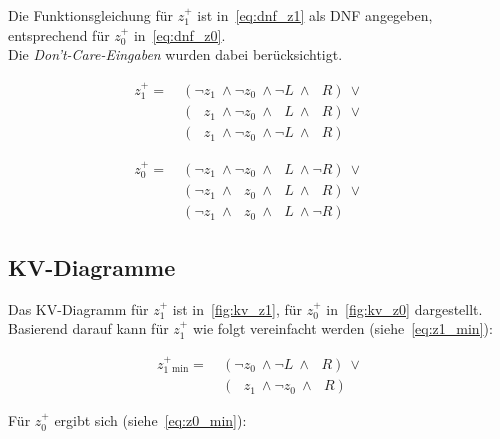 Die Funktionsgleichung für $z_1^+$ ist in~\ref{eq:dnf_z1} als DNF angegeben, entsprechend für $z_0^+$ in~\ref{eq:dnf_z0}.\\
Die \textit{Don't-Care-Eingaben} wurden dabei berücksichtigt.

\begin{equation}\label{eq:dnf_z1}
\begin{alignat}{3}
    z_1^+ =\ &(\neg z_1 \ \land \neg z_0 \ \land \neg L \ \land \phantom{\neg} R)\ \lor &&  \\
    &(\phantom{\neg} z_1 \ \land \neg z_0 \ \land \phantom{\neg} L \ \land \phantom{\neg} R)\ \lor &&  \\
    &(\phantom{\neg} z_1 \ \land \neg z_0 \ \land \neg L \ \land \phantom{\neg} R)
\end{alignat}
\end{equation}

\begin{equation}\label{eq:dnf_z0}
\begin{alignat}{3}
    z_0^+ =\ &(\neg z_1 \ \land \neg z_0 \ \land \phantom{\neg} L \ \land \neg R)\ \lor &&  \\
    &(\neg z_1 \ \land \phantom{\neg} z_0 \ \land \phantom{\neg} L \ \land \phantom{\neg} R)\ \lor &&  \\
    &(\neg z_1 \ \land \phantom{\neg} z_0 \ \land \phantom{\neg} L \ \land \neg R)
\end{alignat}
\end{equation}

\subsection*{KV-Diagramme}

Das KV-Diagramm für $z_1^+$ ist in~\ref{fig:kv_z1}, für $z_0^+$ in~\ref{fig:kv_z0} dargestellt.\\
Basierend darauf kann für $z_1^+$ wie folgt vereinfacht werden (siehe~\ref{eq:z1_min}):

\begin{equation}\label{eq:z1_min}
\begin{alignat}{3}
    z_1^+_{\text{min}} =\ &(\neg z_0 \ \land \neg L \ \land \phantom{\neg} R)\ \lor   \\
    &(\phantom{\neg} z_1 \ \land \neg z_0 \ \land \phantom{\neg} R)
\end{alignat}
\end{equation}

\noindent
Für $z_0^+$ ergibt sich (siehe~\ref{eq:z0_min}):

